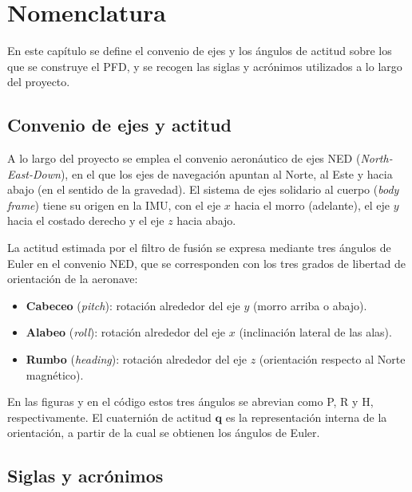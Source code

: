 
\chapter*{Nomenclatura}
\label{ch:nomenclatura}

En este capítulo se define el convenio de ejes y los ángulos de actitud sobre los
que se construye el PFD, y se recogen las siglas y acrónimos utilizados a lo largo del proyecto. 

\section{Convenio de ejes y actitud}
\label{sec:nom_ejes}

A lo largo del proyecto se emplea el convenio aeronáutico de ejes NED (\textit{North-East-Down}),
en el que los ejes de navegación apuntan al Norte, al Este y hacia abajo
(en el sentido de la gravedad). El sistema de ejes solidario al cuerpo
(\textit{body frame}) tiene su origen en la IMU, con el eje $x$ hacia el morro
(adelante), el eje $y$ hacia el costado derecho y el eje $z$ hacia abajo.

La actitud estimada por el filtro de fusión se expresa mediante tres ángulos de
Euler en el convenio NED, que se corresponden con los tres grados de libertad de
orientación de la aeronave:

\begin{itemize}
    \item \textbf{Cabeceo} (\textit{pitch}): rotación alrededor del eje $y$
    (morro arriba o abajo).
    \item \textbf{Alabeo} (\textit{roll}): rotación alrededor del eje $x$
    (inclinación lateral de las alas).
    \item \textbf{Rumbo} (\textit{heading}): rotación alrededor del eje $z$
    (orientación respecto al Norte magnético).
\end{itemize}

En las figuras y en el código estos tres ángulos se abrevian como P, R y H,
respectivamente. El cuaternión de actitud $\mathbf{q}$ es la representación
interna de la orientación, a partir de la cual se obtienen los ángulos de Euler.

\newpage
\section{Siglas y acrónimos}
\label{sec:nom_acronimos}

